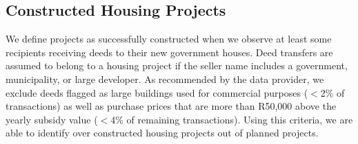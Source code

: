 \documentclass[12pt]{article}
\begin{document}

\subsection{Constructed Housing Projects}



We define projects as successfully constructed when we observe at least some recipients receiving deeds to their new government houses.  Deed transfers are assumed to belong to a housing project if the seller name includes a government, municipality, or large developer.  As recommended by the data provider, we exclude deeds flagged as large buildings used for commercial purposes ($<$2\% of transactions) as well as purchase prices that are more than R50,000 above the yearly subsidy value ($<$4\% of remaining transactions).  Using this criteria, we are able to identify over constructed housing projects out of planned projects.
\end{document}
